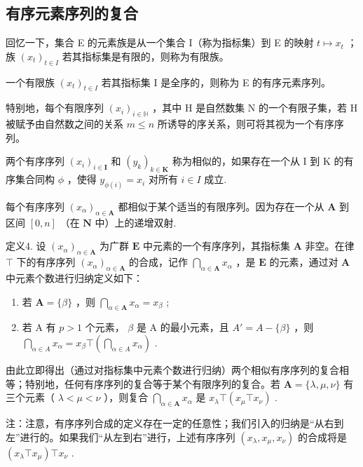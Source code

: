 \subsection{有序元素序列的复合}

回忆一下，集合 E 的元素族是从一个集合 I（称为指标集）到 E 的映射 \(t \mapsto x_{t}\) ；族 \((x_{t})_{t \in I}\) 若其指标集是有限的，则称为有限族。

一个有限族 \((x_{t})_{t\in I}\) 若其指标集 I 是全序的，则称为 E 的有序元素序列。

特别地，每个有限序列 \((x_{i})_{i\in\mathbb{H}}\) ，其中 H 是自然数集 N 的一个有限子集，若 H 被赋予由自然数之间的关系 \(m \leqslant n\) 所诱导的序关系，则可将其视为一个有序序列。

两个有序序列 \((x_{i})_{i\in\mathbf{I}}\) 和 \((y_{k})_{k\in\mathbf{K}}\) 称为相似的，如果存在一个从 I 到 K 的有序集合同构 \(\phi\) ，使得 \(y_{\phi(i)} = x_{i}\) 对所有 \(i \in I\) 成立.

每个有序序列 \((x_{\alpha})_{\alpha \in \mathbf{A}}\) 都相似于某个适当的有限序列。因为存在一个从 \(\mathbf{A}\) 到区间 \([0, n]\) （在 \(\mathbf{N}\) 中）上的递增双射.

定义4. 设 \((x_{\alpha})_{\alpha \in \mathbf{A}}\) 为广群 \(\mathbf{E}\) 中元素的一个有序序列，其指标集 \(\mathbf{A}\) 非空。在律 \(\top\) 下的有序序列 \((x_{\alpha})_{\alpha \in \mathbf{A}}\) 的合成，记作 \(\bigcap_{\alpha \in \mathbf{A}} x_{\alpha}\) ，是 \(\mathbf{E}\) 的元素，通过对 \(\mathbf{A}\) 中元素个数进行归纳定义如下：

\begin{enumerate}
\def\labelenumi{(\arabic{enumi})}
\item
  若 \(\mathbf{A} = \{\beta\}\) ，则 \(\bigcap_{\alpha \in \mathbf{A}} x_{\alpha} = x_{\beta}\) ;
\item
  若 A 有 \(p > 1\) 个元素， \(\beta\) 是 A 的最小元素，且 \(A' = A - \{\beta\}\) ，则 \(\bigcap_{\alpha \in A} x_{\alpha} = x_{\beta} \top \left( \bigcap_{\alpha \in A} x_{\alpha} \right)\) .
\end{enumerate}

由此立即得出（通过对指标集中元素个数进行归纳）两个相似有序序列的复合相等；特别地，任何有序序列的复合等于某个有限序列的复合。若 \(\mathbf{A} = \{\lambda, \mu, \nu\}\) 有三个元素（ \(\lambda < \mu < \nu\) ），则复合 \(\bigcap_{\alpha \in \mathbf{A}} x_{\alpha}\) 是 \(x_{\lambda} \top (x_{\mu} \top x_{\nu})\) .

注：注意，有序序列合成的定义存在一定的任意性；我们引入的归纳是“从右到左”进行的。如果我们“从左到右”进行，上述有序序列 \((x_{\lambda}, x_{\mu}, x_{\nu})\) 的合成将是 \((x_{\lambda} \top x_{\mu}) \top x_{\nu}\) .

